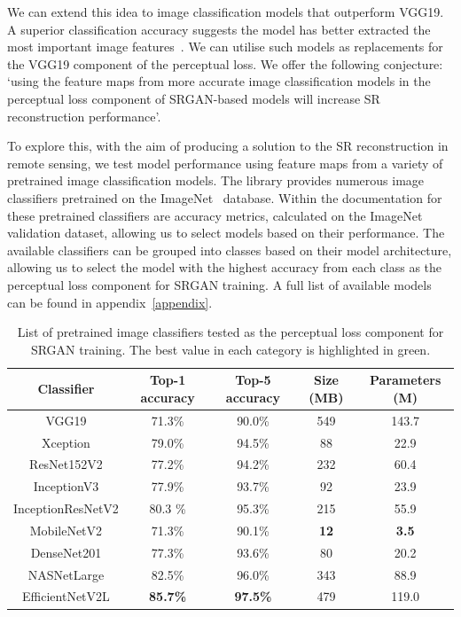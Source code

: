 We can extend this idea to image classification models that outperform VGG19. A superior classification accuracy suggests the model has better extracted the most important image features~\cite{featureExtraction}. We can utilise such models as replacements for the VGG19 component of the perceptual loss. We offer the following conjecture: `using the feature maps from more accurate image classification models in the perceptual loss component of SRGAN-based models will increase SR reconstruction performance'.

To explore this, with the aim of producing a solution to the SR reconstruction in remote sensing, we test model performance using feature maps from a variety of pretrained image classification models. The  library provides numerous image classifiers pretrained on the ImageNet~\cite{imageNet} database. Within the documentation for these pretrained classifiers are accuracy metrics, calculated on the ImageNet validation dataset, allowing us to select models based on their performance. The available classifiers can be grouped into classes based on their model architecture, allowing us to select the model with the highest accuracy from each class as the perceptual loss component for SRGAN training. A full list of available models can be found in appendix~\ref{appendix}.
\begin{table}
    \centering
    \begin{tabular}{ccccc}
        \toprule
        \textbf{Classifier} & \textbf{Top-1 accuracy} & \textbf{Top-5 accuracy} & \textbf{Size (MB)} & \textbf{Parameters (M)} \\
        \midrule
        VGG19 & 71.3\% & 90.0\% & 549 & 143.7 \\
        Xception & 79.0\% & 94.5\% & 88 & 22.9 \\
        ResNet152V2 & 77.2\% & 94.2\% & 232 & 60.4 \\
        InceptionV3 & 77.9\% & 93.7\% & 92 & 23.9 \\
        InceptionResNetV2 & 80.3 \% & 95.3\% & 215 & 55.9 \\
        MobileNetV2 & 71.3\% & 90.1\% & \textbf{12} & \textbf{3.5} \\
        DenseNet201 & 77.3\% & 93.6\% & 80 & 20.2 \\
        NASNetLarge & 82.5\% & 96.0\% & 343 & 88.9 \\
    EfficientNetV2L & \textbf{85.7\%} & \textbf{97.5\%} & 479 & 119.0 \\
        \bottomrule
    \end{tabular}
    \caption{List of pretrained image classifiers tested as the perceptual loss component for SRGAN training. The best value in each category is highlighted in green.}
    \label{table:pretrained_classifiers}
\end{table}

